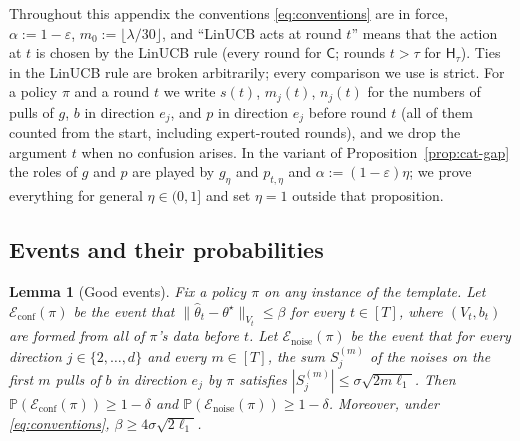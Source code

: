 \documentclass{article}
\newtheorem{lemma}{Lemma}
\theoremstyle{definition}
\theoremstyle{remark}
\newcommand{\Prb}{\mathbb{P}}
\newcommand{\eps}{\varepsilon}
\theoremstyle{remark}
\newcommand{\Cold}{\mathsf{C}}
\newcommand{\Hyb}{\mathsf{H}}
\begin{document}
Throughout this appendix the conventions \eqref{eq:conventions} are in force,
$\alpha:=1-\eps$, $m_0:=\lfloor\lambda/30\rfloor$, and ``LinUCB acts at round
$t$'' means that the action at $t$ is chosen by the LinUCB rule (every round
for $\Cold$; rounds $t>\tau$ for $\Hyb_\tau$). Ties in the LinUCB rule are
broken arbitrarily; every comparison we use is strict. For a policy $\pi$ and
a round $t$ we write $s(t)$, $m_j(t)$, $n_j(t)$ for the numbers of pulls of
$g$, $b$ in direction $e_j$, and $p$ in direction $e_j$ before round $t$
(all of them counted from the start, including expert-routed rounds), and we
drop the argument $t$ when no confusion arises. In the variant of
Proposition~\ref{prop:cat-gap} the roles of $g$ and $p$ are played by
$g_\eta$ and $p_{t,\eta}$ and $\alpha:=(1-\eps)\eta$; we prove everything for
general $\eta\in(0,1]$ and set $\eta=1$ outside that proposition.

\subsection{Events and their probabilities}

\begin{lemma}[Good events]
\label{lem:cat-events}
Fix a policy $\pi$ on any instance of the template. Let
$\mathcal E_{\mathrm{conf}}(\pi)$ be the event that
$\|\widehat\theta_t-\theta^\star\|_{V_t}\le\beta$ for every $t\in[T]$, where
$(V_t,b_t)$ are formed from all of $\pi$'s data before $t$. Let
$\mathcal E_{\mathrm{noise}}(\pi)$ be the event that for every direction
$j\in\{2,\dots,d\}$ and every $m\in[T]$, the sum $S_j^{(m)}$ of the noises on
the first $m$ pulls of $b$ in direction $e_j$ by $\pi$ satisfies
$|S_j^{(m)}|\le\sigma\sqrt{2m\ell_1}$. Then
$\Prb(\mathcal E_{\mathrm{conf}}(\pi))\ge1-\delta$ and
$\Prb(\mathcal E_{\mathrm{noise}}(\pi))\ge1-\delta$. Moreover, under
\eqref{eq:conventions}, $\beta\ge4\sigma\sqrt{2\ell_1}$.
\end{lemma}
\end{document}
